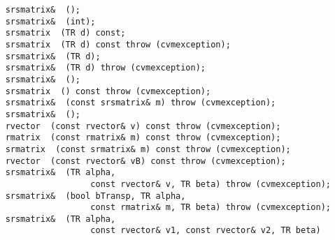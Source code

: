 \verb"    srsmatrix& "\verb" ();"\\
\verb"    srsmatrix& "\verb" (int);"\\
\verb"    srsmatrix "\verb" (TR d) const;"\\
\verb"    srsmatrix "\verb" (TR d) const throw (cvmexception);"\\
\verb"    srsmatrix& "\verb" (TR d);"\\
\verb"    srsmatrix& "\verb" (TR d) throw (cvmexception);"\\
\verb"    srsmatrix& "\verb" ();"\\
\verb"    srsmatrix "\verb" () const throw (cvmexception);"\\
\verb"    srsmatrix& "\verb" (const srsmatrix& m) throw (cvmexception);"\\
\verb"    srsmatrix& "\verb" ();"\\
\verb"    rvector "\verb" (const rvector& v) const throw (cvmexception);"\\
\verb"    rmatrix "\verb" (const rmatrix& m) const throw (cvmexception);"\\
\verb"    srmatrix "\verb" (const srmatrix& m) const throw (cvmexception);"\\
\verb"    rvector "\verb" (const rvector& vB) const throw (cvmexception);"\\
\verb"    srsmatrix& "\verb" (TR alpha,"\\
\verb"                     const rvector& v, TR beta) throw (cvmexception);"\\
\verb"    srsmatrix& "\verb" (bool bTransp, TR alpha,"\\
\verb"                     const rmatrix& m, TR beta) throw (cvmexception);"\\
\verb"    srsmatrix& "\verb" (TR alpha,"\\
\verb"                     const rvector& v1, const rvector& v2, TR beta)"\\
